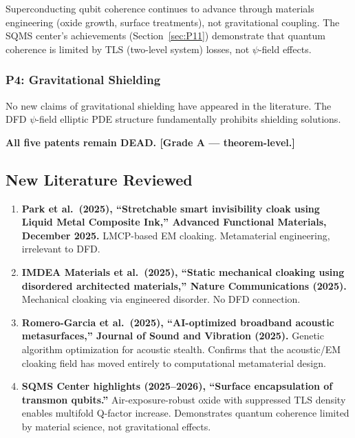 \documentclass[11pt]{article}
\begin{document}
Superconducting qubit coherence continues to advance through
materials engineering (oxide growth, surface treatments), not
gravitational coupling. The SQMS center's achievements
(Section~\ref{sec:P11}) demonstrate that quantum coherence is
limited by TLS (two-level system) losses, not $\psi$-field effects.

\subsubsection{P4: Gravitational Shielding}

No new claims of gravitational shielding have appeared in the
literature. The DFD $\psi$-field elliptic PDE structure fundamentally
prohibits shielding solutions.

\textbf{All five patents remain DEAD. [Grade A --- theorem-level.]}

\subsection{New Literature Reviewed}

\begin{tcolorbox}[colback=green!5!white, colframe=green!50!black,
  title=\textbf{Agent 6: NEW LITERATURE REVIEWED}]

\begin{enumerate}

\item \textbf{Park et al.\ (2025), ``Stretchable smart invisibility
  cloak using Liquid Metal Composite Ink,'' Advanced Functional
  Materials, December 2025.}
  LMCP-based EM cloaking. Metamaterial engineering, irrelevant to DFD.

\item \textbf{IMDEA Materials et al.\ (2025), ``Static mechanical
  cloaking using disordered architected materials,'' Nature
  Communications (2025).}
  Mechanical cloaking via engineered disorder. No DFD connection.

\item \textbf{Romero-Garcia et al.\ (2025), ``AI-optimized broadband
  acoustic metasurfaces,'' Journal of Sound and Vibration (2025).}
  Genetic algorithm optimization for acoustic stealth. Confirms that
  the acoustic/EM cloaking field has moved entirely to computational
  metamaterial design.

\item \textbf{SQMS Center highlights (2025--2026), ``Surface
  encapsulation of transmon qubits.''}
  Air-exposure-robust oxide with suppressed TLS density enables
  multifold Q-factor increase. Demonstrates quantum coherence limited
  by material science, not gravitational effects.

\end{enumerate}
\end{tcolorbox}
\end{document}
